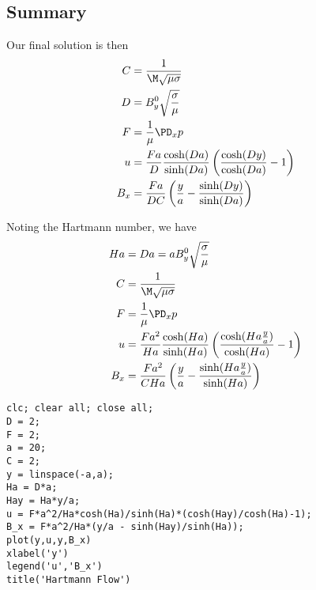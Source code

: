\documentclass[11pt]{article}
\begin{document}
\subsection{Summary}

Our final solution is then
\begin{equation}\begin{aligned}
C   & = \frac{1}{\M \sqrt{\mu \sigma}} \\
D   & = B_y^0 \sqrt{\frac{\sigma}{\mu}} \\
F   & = \frac{1}{\mu} \PD_x p \\
u   & = \frac{Fa}{D} \frac{\cosh(Da)}{\sinh(Da)}  \left( \frac{\cosh(Dy)}{\cosh(Da)}  - 1 \right) \\
B_x & = \frac{Fa}{DC} \left(\frac{y}{a} - \frac{\sinh(Dy)}{\sinh(Da)}\right) \\
\end{aligned} \end{equation}

Noting the Hartmann number, we have
\begin{equation}\begin{aligned}
Ha  & = Da = a B_y^0 \sqrt{\frac{\sigma}{\mu}} \\
C   & = \frac{1}{\M \sqrt{\mu \sigma}} \\
F   & = \frac{1}{\mu} \PD_x p \\
u   & = \frac{Fa^2}{Ha} \frac{\cosh(Ha)}{\sinh(Ha)}  \left( \frac{\cosh(Ha \frac{y}{a} )}{\cosh(Ha)}  - 1 \right) \\
B_x & = \frac{Fa^2}{CHa} \left(\frac{y}{a} - \frac{\sinh(Ha \frac{y}{a})}{\sinh(Ha)}\right) \\
\end{aligned} \end{equation}

\begin{verbatim}
clc; clear all; close all;
D = 2;
F = 2;
a = 20;
C = 2;
y = linspace(-a,a);
Ha = D*a;
Hay = Ha*y/a;
u = F*a^2/Ha*cosh(Ha)/sinh(Ha)*(cosh(Hay)/cosh(Ha)-1);
B_x = F*a^2/Ha*(y/a - sinh(Hay)/sinh(Ha));
plot(y,u,y,B_x)
xlabel('y')
legend('u','B_x')
title('Hartmann Flow')
\end{verbatim}
\end{document}
